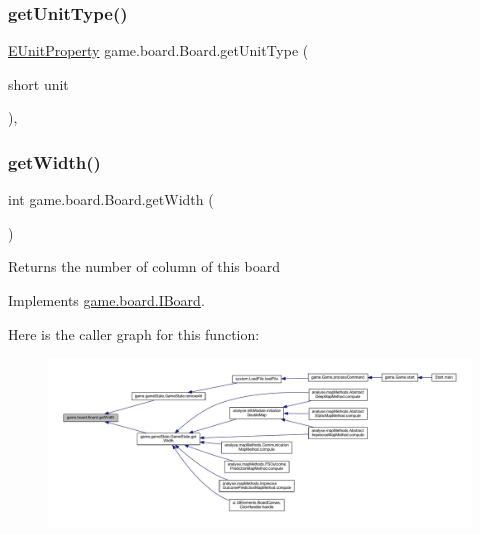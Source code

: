 \subsubsection{\texorpdfstring{get\+Unit\+Type()}{getUnitType()}\hspace{0.1cm}{\footnotesize\ttfamily [2/2]}}
{\footnotesize\ttfamily \mbox{\hyperlink{enumrule_engine_1_1entity_1_1_e_unit_property}{E\+Unit\+Property}} game.\+board.\+Board.\+get\+Unit\+Type (\begin{DoxyParamCaption}\item[{short}]{unit }\end{DoxyParamCaption})\hspace{0.3cm}{\ttfamily [inline]}, {\ttfamily [private]}}

\mbox{\label{classgame_1_1board_1_1_board_a831e13d9108a75d6efc5a92994ea1316}} 
\subsubsection{\texorpdfstring{get\+Width()}{getWidth()}}
{\footnotesize\ttfamily int game.\+board.\+Board.\+get\+Width (\begin{DoxyParamCaption}{ }\end{DoxyParamCaption})\hspace{0.3cm}{\ttfamily [inline]}}

\begin{DoxyReturn}{Returns}
the number of column of this board 
\end{DoxyReturn}


Implements \mbox{\hyperlink{interfacegame_1_1board_1_1_i_board_a86c145dd3518d14b37f6b50ee67bc629}{game.\+board.\+I\+Board}}.

Here is the caller graph for this function\+:
\nopagebreak
\begin{figure}[H]
\begin{center}
\leavevmode
\includegraphics[width=350pt]{classgame_1_1board_1_1_board_a831e13d9108a75d6efc5a92994ea1316_icgraph}
\end{center}
\end{figure}
\mbox{\label{classgame_1_1board_1_1_board_a6b6e3fb41b451a50ef9d5135067c2582}} 
